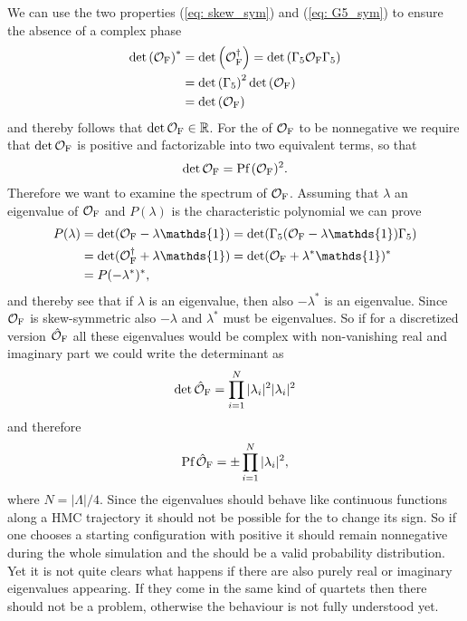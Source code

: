%
%
We can use the two properties (\ref{eq: skew_sym}) and (\ref{eq: G5_sym}) to ensure the absence of a complex phase
%
%
\begin{align}
\det \left(\mathcal{O}_{\rm F}\right)^{*} &= \det  \left( \mathcal{O}_{\rm F}^{\dagger}\right) = \det \left( \Gamma_{5}\mathcal{O}_{\rm F} \Gamma_{5} \right) \notag \\
%
%
&= \det \left(\Gamma_{5}\right)^{2} \det \left(\mathcal{O}_{\rm F}\right) \\
%
%
&= \det \left(\mathcal{O}_{\rm F}\right) \notag
\end{align}
%
%
and thereby follows that $\det\mathcal{O}_{\rm F} \in \mathbb{R}$. For the  of $\mathcal{O}_{\rm F}$ to be nonnegative we require that $\det \mathcal{O}_{\rm F}$ is positive and factorizable into two equivalent terms, so that
%
%
\begin{equation}
\det \mathcal{O}_{\rm F} = \text{Pf}\,(\mathcal{O}_{\rm F})^{2}.
\end{equation}
%
%
Therefore we want to examine the spectrum of $\mathcal{O}_{\rm F}$. Assuming that $\lambda$ an eigenvalue of $\mathcal{O}_{\rm F}$ and $P(\lambda)$ is the characteristic polynomial we can prove
%
%
\begin{align}
P(\lambda) &= \det (\mathcal{O}_{\rm F} -\lambda\mathds{1}) = \det (\Gamma_{5}(\mathcal{O}_{\rm F} -\lambda\mathds{1})\Gamma_{5}) \notag \\
%
&= \det (\mathcal{O}_{\rm F}^{\dagger}+\lambda\mathds{1}) = \det (\mathcal{O}_{\rm F} +\lambda^{*}\mathds{1})^{*} \\
&= P(-\lambda^{*})^{*}, \notag
\end{align}
%
%
and thereby see that if $\lambda$ is an eigenvalue, then also $-\lambda^{*}$ is an eigenvalue. Since $\mathcal{O}_{\rm F}$ is skew-symmetric also $-\lambda$ and $\lambda^{*}$ must be eigenvalues. So if for a discretized version $\hat{\mathcal{O}}_{\rm F}$ all these eigenvalues would be complex with non-vanishing real and imaginary part we could write the determinant as
%
%
\begin{equation}
\det \hat{\mathcal{O}}_{\rm F} = \prod\limits_{i=1}^{N} \vert \lambda_{i}\vert^{2} \vert \lambda_{i} \vert^{2}
\end{equation}
%
%
and therefore
%
%
\begin{equation}
\text{Pf}\,\hat{\mathcal{O}}_{\rm F} =  \pm\prod\limits_{i=1}^{N} \vert \lambda_{i}\vert^{2},
\end{equation}
%
%
where $N=\vert \mathit{\Lambda}\vert /4$. Since the eigenvalues should behave like continuous functions along a HMC trajectory it should not be possible for the  to change its sign. So if one chooses a starting configuration with positive  it should remain nonnegative during the whole simulation and the  should be a valid probability distribution. Yet it is not quite clears what happens if there are also purely real or imaginary eigenvalues appearing. If they come in the same kind of quartets then there should not be a problem, otherwise the behaviour is not fully understood yet.
%
%
%
%
%
%
%
%
%
%
